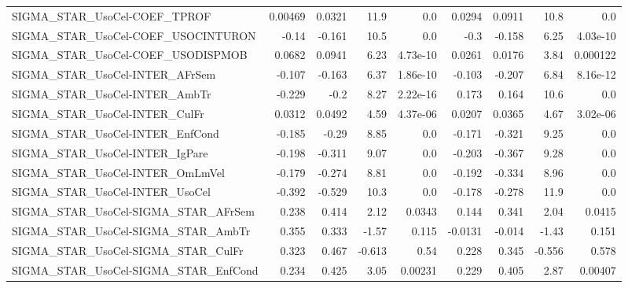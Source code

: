\begin{tabular}{lrrrrrrrr}
SIGMA\_STAR\_UsoCel-COEF\_TPROF          &     0.00469 &       0.0321 &    11.9 &      0.0 &     0.0294 &      0.0911 &         10.8 &           0.0 \\
SIGMA\_STAR\_UsoCel-COEF\_USOCINTURON    &       -0.14 &       -0.161 &    10.5 &      0.0 &       -0.3 &      -0.158 &         6.25 &      4.03e-10 \\
SIGMA\_STAR\_UsoCel-COEF\_USODISPMOB     &      0.0682 &       0.0941 &    6.23 & 4.73e-10 &     0.0261 &      0.0176 &         3.84 &      0.000122 \\
SIGMA\_STAR\_UsoCel-INTER\_AFrSem        &      -0.107 &       -0.163 &    6.37 & 1.86e-10 &     -0.103 &      -0.207 &         6.84 &      8.16e-12 \\
SIGMA\_STAR\_UsoCel-INTER\_AmbTr         &      -0.229 &         -0.2 &    8.27 & 2.22e-16 &      0.173 &       0.164 &         10.6 &           0.0 \\
SIGMA\_STAR\_UsoCel-INTER\_CulFr         &      0.0312 &       0.0492 &    4.59 & 4.37e-06 &     0.0207 &      0.0365 &         4.67 &      3.02e-06 \\
SIGMA\_STAR\_UsoCel-INTER\_EnfCond       &      -0.185 &        -0.29 &    8.85 &      0.0 &     -0.171 &      -0.321 &         9.25 &           0.0 \\
SIGMA\_STAR\_UsoCel-INTER\_IgPare        &      -0.198 &       -0.311 &    9.07 &      0.0 &     -0.203 &      -0.367 &         9.28 &           0.0 \\
SIGMA\_STAR\_UsoCel-INTER\_OmLmVel       &      -0.179 &       -0.274 &    8.81 &      0.0 &     -0.192 &      -0.334 &         8.96 &           0.0 \\
SIGMA\_STAR\_UsoCel-INTER\_UsoCel        &      -0.392 &       -0.529 &    10.3 &      0.0 &     -0.178 &      -0.278 &         11.9 &           0.0 \\
SIGMA\_STAR\_UsoCel-SIGMA\_STAR\_AFrSem   &       0.238 &        0.414 &    2.12 &   0.0343 &      0.144 &       0.341 &         2.04 &        0.0415 \\
SIGMA\_STAR\_UsoCel-SIGMA\_STAR\_AmbTr    &       0.355 &        0.333 &   -1.57 &    0.115 &    -0.0131 &      -0.014 &        -1.43 &         0.151 \\
SIGMA\_STAR\_UsoCel-SIGMA\_STAR\_CulFr    &       0.323 &        0.467 &  -0.613 &     0.54 &      0.228 &       0.345 &       -0.556 &         0.578 \\
SIGMA\_STAR\_UsoCel-SIGMA\_STAR\_EnfCond  &       0.234 &        0.425 &    3.05 &  0.00231 &      0.229 &       0.405 &         2.87 &       0.00407 \\

\end{tabular}
